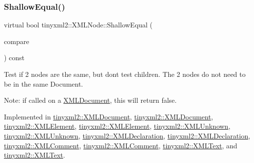 \mbox{\label{classtinyxml2_1_1XMLNode_a7ce18b751c3ea09eac292dca264f9226}} 
\subsubsection{\texorpdfstring{Shallow\+Equal()}{ShallowEqual()}\hspace{0.1cm}{\footnotesize\ttfamily [1/2]}}
{\footnotesize\ttfamily virtual bool tinyxml2\+::\+X\+M\+L\+Node\+::\+Shallow\+Equal (\begin{DoxyParamCaption}\item[{const \hyperlink{classtinyxml2_1_1XMLNode}{X\+M\+L\+Node} $\ast$}]{compare }\end{DoxyParamCaption}) const\hspace{0.3cm}{\ttfamily [pure virtual]}}

Test if 2 nodes are the same, but don\textquotesingle{}t test children. The 2 nodes do not need to be in the same Document.

Note\+: if called on a \hyperlink{classtinyxml2_1_1XMLDocument}{X\+M\+L\+Document}, this will return false. 

Implemented in \hyperlink{classtinyxml2_1_1XMLDocument_a6fe5ef18699091844fcf64b56ffa5bf9}{tinyxml2\+::\+X\+M\+L\+Document}, \hyperlink{classtinyxml2_1_1XMLDocument_a6fe5ef18699091844fcf64b56ffa5bf9}{tinyxml2\+::\+X\+M\+L\+Document}, \hyperlink{classtinyxml2_1_1XMLElement_ad9ea913a460b48979bd83cf9871c99f6}{tinyxml2\+::\+X\+M\+L\+Element}, \hyperlink{classtinyxml2_1_1XMLElement_a61ffd7bf918a9db4aa6203d855ac5ec2}{tinyxml2\+::\+X\+M\+L\+Element}, \hyperlink{classtinyxml2_1_1XMLUnknown_a0715ab2c05d7f74845c188122213b116}{tinyxml2\+::\+X\+M\+L\+Unknown}, \hyperlink{classtinyxml2_1_1XMLUnknown_ac46767cd721d666e690a6231dfb618d1}{tinyxml2\+::\+X\+M\+L\+Unknown}, \hyperlink{classtinyxml2_1_1XMLDeclaration_aa26b70011694e9b9e9480b929e9b78d6}{tinyxml2\+::\+X\+M\+L\+Declaration}, \hyperlink{classtinyxml2_1_1XMLDeclaration_ae8b4d3a399857029f36c322b0801b69c}{tinyxml2\+::\+X\+M\+L\+Declaration}, \hyperlink{classtinyxml2_1_1XMLComment_a6f7d227b25afa8cc3c763b7cc8833739}{tinyxml2\+::\+X\+M\+L\+Comment}, \hyperlink{classtinyxml2_1_1XMLComment_a965d880a99d58dd915caa88dc37a9b51}{tinyxml2\+::\+X\+M\+L\+Comment}, \hyperlink{classtinyxml2_1_1XMLText_ae0fff8a24e2de7eb073fd192e9db0331}{tinyxml2\+::\+X\+M\+L\+Text}, and \hyperlink{classtinyxml2_1_1XMLText_a99d8bce4dc01df889126e047f358cdfc}{tinyxml2\+::\+X\+M\+L\+Text}.


